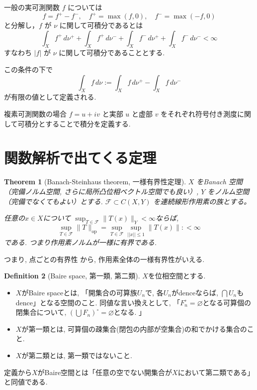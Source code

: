 \documentclass[dvipdfmx,a4paper,11pt]{article} %
\newtheorem{thm}{Theorem}[section]
\theoremstyle{definition}
\newtheorem{defn}[thm]{Definition}
\theoremstyle{remark}
\numberwithin{equation}{section}
\begin{document}
一般の実可測関数 \(f\) については
\[
f = f^+ - f^-, \quad f^+ = \max(f,0), \quad f^- = \max(-f,0)
\]
と分解し，\(f\) が \(\nu\) に関して可積分であるとは
\[
\int_X f^+ \, d\nu^+ + \int_X f^+ \, d\nu^- + \int_X f^- \, d\nu^+ + \int_X f^- \, d\nu^- < \infty
\]
すなわち \(|f|\) が \(\nu\) に関して可積分であることとする. 

この条件の下で
\[
\int_X f \, d\nu := \int_X f \, d\nu^+ - \int_X f \, d\nu^-
\]
が有限の値として定義される. 

複素可測関数の場合 \(f = u + iv\) と実部 \(u\) と虚部 \(v\) をそれぞれ符号付き測度に関して可積分とすることで積分を定義する. 

\section*{関数解析で出てくる定理}

\begin{tcolorbox}[mybox]
\begin{thm}[Banach-Steinhaus theorem, 一様有界性定理]
\(X\) をBanach 空間（完備ノルム空間, さらに局所凸位相ベクトル空間でも良い）,   
\(Y\) をノルム空間（完備でなくてもよい）とする. 
\(\mathcal{F} \subset C(X,Y)\) を連続線形作用素の族とする。

任意の$x \in X$について
\(\sup_{T \in \mathcal{F}} \|T(x)\|_Y < \infty\)ならば, 
\[
\sup_{T \in \mathcal{F}} \|T\|_{\mathrm{op}}= 
\sup_{T \in \mathcal{F}} \sup_{|| x || \le 1}\|T (x)\|:
< \infty
\]
である. つまり作用素ノルムが一様に有界である. 
\end{thm}
\end{tcolorbox}
つまり, 点ごとの有界性%
から, 作用素全体の一様有界性がいえる. %


\begin{tcolorbox}[mybox]
\begin{defn}[Baire space, 第一類, 第二類]
$X$を位相空間とする.
\begin{itemize}
\item $X$がBaire spaceとは, 「開集合の可算族$U_n$で, 各$U_n$がdenceならば, $\bigcap U_n$もdence」となる空間のこと. 同値な言い換えとして, 「$F_{n}^{\circ}=\varnothing$となる可算個の閉集合について, $(\bigcup F_n)^{\circ} = \varnothing$となる. 」
\item $X$が第一類とは, 可算個の疎集合(閉包の内部が空集合)の和でかける集合のこと. 
\item$X$が第二類とは, 第一類ではないこと. 
\end{itemize}
定義から$X$がBaire空間とは「任意の空でない開集合が$X$において第二類である」と同値である. 
\end{defn}
\end{tcolorbox}
\end{document}
